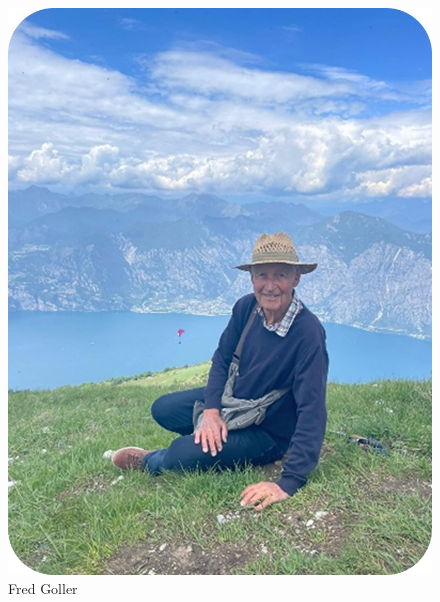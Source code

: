 \begin{figure}[h!]
	\centering
	\begin{minipage}{0.12\linewidth}
		\centering
		\includegraphics[width=\linewidth]{images/Fred}
		\caption*{Fred Goller}
	\end{minipage}
	\hfill
	\begin{minipage}{0.12\linewidth}
		\centering

\end{minipage}
\end{figure}
